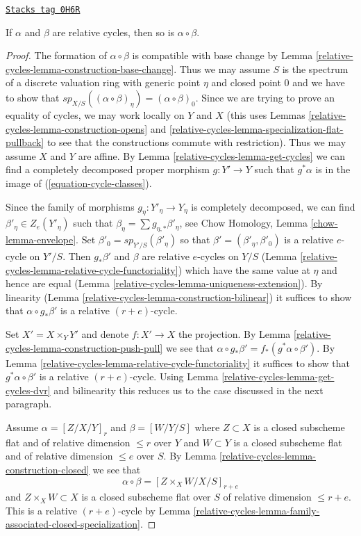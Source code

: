 \begin{lemma}
\label{relative-cycles-lemma-well-defined}
\href{https://stacks.math.columbia.edu/tag/0H6R}{\texttt{Stacks tag 0H6R}}

If $\alpha$ and $\beta$ are relative cycles, then so is $\alpha \circ \beta$.
\end{lemma}

\begin{proof}
The formation of $\alpha \circ \beta$ is compatible with base change
by Lemma \ref{relative-cycles-lemma-construction-base-change}. Thus we may assume
$S$ is the spectrum of a discrete valuation ring with generic point
$\eta$ and closed point $0$ and we have to show that
$sp_{X/S}((\alpha \circ \beta)_\eta) = (\alpha \circ \beta)_0$.
Since we are trying to prove an equality of cycles, we may
work locally on $Y$ and $X$ (this uses
Lemmas \ref{relative-cycles-lemma-construction-opens} and
\ref{relative-cycles-lemma-specialization-flat-pullback}
to see that the constructions commute with restriction).
Thus we may assume $X$ and $Y$ are affine.
By Lemma \ref{relative-cycles-lemma-get-cycles}
we can find a completely decomposed proper morphism
$g : Y' \to Y$ such that $g^*\alpha$ is in the image of
(\ref{equation-cycle-classes}).

\medskip\noindent
Since the family of morphisms $g_\eta : Y'_\eta \to Y_\eta$
is completely decomposed, we can find $\beta'_\eta \in Z_e(Y'_\eta)$ such that
$\beta_\eta = \sum g_{\eta, *}\beta'_\eta$, see
Chow Homology, Lemma \ref{chow-lemma-envelope}.
Set $\beta'_0 = sp_{Y'/S}(\beta'_\eta)$ so that
$\beta' = (\beta'_\eta, \beta'_0)$ is a relative $e$-cycle on $Y'/S$. Then
$g_*\beta'$ and $\beta$ are relative $e$-cycles
on $Y/S$ (Lemma \ref{relative-cycles-lemma-relative-cycle-functoriality})
which have the same value at $\eta$ and hence are equal
(Lemma \ref{relative-cycles-lemma-uniqueness-extension}). By linearity
(Lemma \ref{relative-cycles-lemma-construction-bilinear})
it suffices to show that $\alpha \circ g_*\beta'$
is a relative $(r + e)$-cycle.

\medskip\noindent
Set $X' = X \times_Y Y'$ and denote $f : X' \to X$ the projection.
By Lemma \ref{relative-cycles-lemma-construction-push-pull} we see that
$\alpha \circ g_*\beta' = f_*(g^*\alpha \circ \beta')$.
By Lemma \ref{relative-cycles-lemma-relative-cycle-functoriality}
it suffices to show that $g^*\alpha \circ \beta'$
is a relative $(r + e)$-cycle. Using Lemma \ref{relative-cycles-lemma-get-cycles-dvr}
and bilinearity this reduces us to the case discussed in the next paragraph.

\medskip\noindent
Assume $\alpha = [Z/X/Y]_r$ and $\beta = [W/Y/S]$
where $Z \subset X$ is a closed subscheme flat and of relative
dimension $\leq r$ over $Y$ and $W \subset Y$ is a closed
subscheme flat and of relative dimension $\leq e$ over $S$.
By Lemma \ref{relative-cycles-lemma-construction-closed} we see that
$$
\alpha \circ \beta = [Z \times_X W/X/S]_{r + e}
$$
and $Z \times_X W \subset X$ is a closed subscheme flat over $S$
of relative dimension $\leq r + e$. This is a relative $(r + e)$-cycle by
Lemma \ref{relative-cycles-lemma-family-associated-closed-specialization}.
\end{proof}

